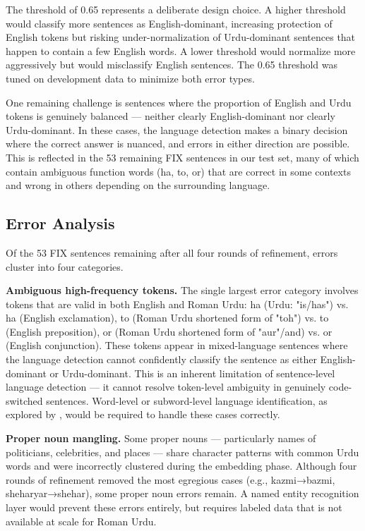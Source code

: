\documentclass[11pt]{article}
\begin{document}
The threshold of 0.65 represents a deliberate design choice. A higher threshold would classify more sentences as English-dominant, increasing protection of English tokens but risking under-normalization of Urdu-dominant sentences that happen to contain a few English words. A lower threshold would normalize more aggressively but would misclassify English sentences. The 0.65 threshold was tuned on development data to minimize both error types.

One remaining challenge is sentences where the proportion of English and Urdu tokens is genuinely balanced — neither clearly English-dominant nor clearly Urdu-dominant. In these cases, the language detection makes a binary decision where the correct answer is nuanced, and errors in either direction are possible. This is reflected in the 53 remaining FIX sentences in our test set, many of which contain ambiguous function words (ha, to, or) that are correct in some contexts and wrong in others depending on the surrounding language.


\subsection{Error Analysis}
Of the 53 FIX sentences remaining after all four rounds of refinement, errors cluster into four categories.

\textbf{Ambiguous high-frequency tokens.} The single largest error category involves tokens that are valid in both English and Roman Urdu: ha (Urdu: "is/has") vs. ha (English exclamation), to (Roman Urdu shortened form of "toh") vs. to (English preposition), or (Roman Urdu shortened form of "aur"/and) vs. or (English conjunction). These tokens appear in mixed-language sentences where the language detection cannot confidently classify the sentence as either English-dominant or Urdu-dominant. This is an inherent limitation of sentence-level language detection — it cannot resolve token-level ambiguity in genuinely code-switched sentences. Word-level or subword-level language identification, as explored by \citet{cetinoglu2016challenges}, would be required to handle these cases correctly.

\textbf{Proper noun mangling.} Some proper nouns — particularly names of politicians, celebrities, and places — share character patterns with common Urdu words and were incorrectly clustered during the embedding phase. Although four rounds of refinement removed the most egregious cases (e.g., kazmi→bazmi, sheharyar→shehar), some proper noun errors remain. A named entity recognition layer would prevent these errors entirely, but requires labeled data that is not available at scale for Roman Urdu.
\end{document}
